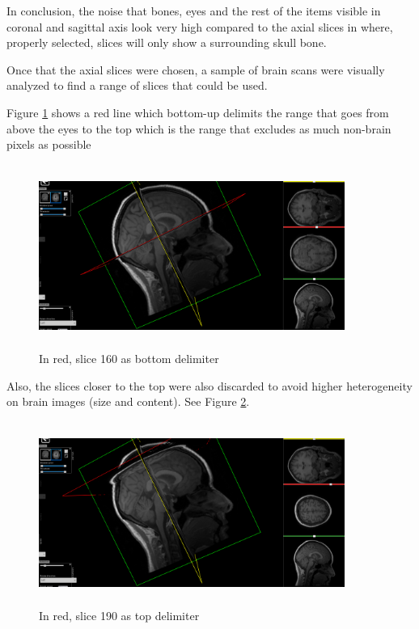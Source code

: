 In conclusion, the noise that bones, eyes and the rest of the items visible in coronal and sagittal axis look very high compared to the axial slices in where, properly selected, slices will only show a surrounding skull bone.

Once that the axial slices were chosen, a sample of brain scans were visually analyzed to find a range of slices that could be used.

Figure \ref*{fig:slice160} shows a red line which bottom-up delimits  the range that goes from above the eyes to the top which is the range that excludes as much non-brain pixels as possible

\begin{figure}[ht]
    \centering
    \includegraphics[width = 10cm, height = 6cm]{images/nifti-slice160.png}
    \caption[]{In red, slice 160 as bottom delimiter}
    \label{fig:slice160}
\end{figure}

Also, the slices closer to the top were also discarded to avoid higher heterogeneity on brain images (size and content). See Figure \ref*{fig:slice190}.

\begin{figure}[ht]
    \centering
    \includegraphics[width = 10cm, height = 6cm]{images/nifti-slice190.png}
    \caption[]{In red, slice 190 as top delimiter}
    \label{fig:slice190}
\end{figure}

